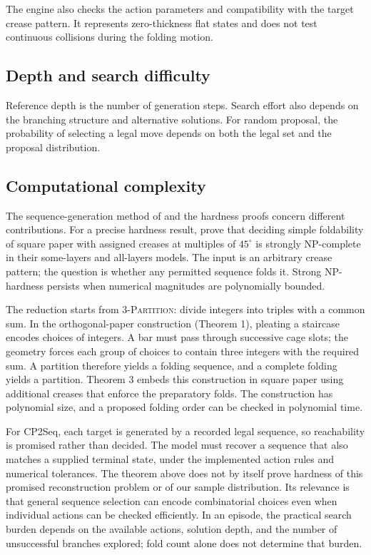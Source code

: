 The engine also checks the action parameters and compatibility with the target crease pattern. It represents
zero-thickness flat states and does not test continuous collisions during the folding motion.

\subsection{Depth and search difficulty}

Reference depth is the number of generation steps. Search effort also depends on the
branching structure and alternative solutions. For random proposal, the probability of
selecting a legal move depends on both the legal set and the proposal distribution.

\subsection{Computational complexity}
\label{app:folding-complexity}

The sequence-generation method of \citet{akitaya-cp2seq} and the hardness proofs concern
different contributions. For a precise hardness result, \citet[Theorem 3]{akitaya-hard}
prove that deciding simple foldability of square paper with assigned creases at multiples
of $45^\circ$ is strongly NP-complete in their some-layers and all-layers models.
The input is an arbitrary crease pattern; the question is whether any permitted sequence
folds it. Strong NP-hardness persists when numerical magnitudes are polynomially bounded.

The reduction starts from \textsc{3-Partition}: divide integers into triples with a common
sum. In the orthogonal-paper construction (Theorem 1), pleating a staircase encodes choices
of integers. A bar must pass through successive cage slots; the geometry forces each group
of choices to contain three integers with the required sum. A partition therefore yields
a folding sequence, and a complete folding yields a partition. Theorem 3 embeds this
construction in square paper using additional creases that enforce the preparatory folds.
The construction has polynomial size, and a proposed folding order can be checked in
polynomial time.

For CP2Seq, each target is generated by a recorded legal sequence, so reachability is
promised rather than decided. The model must recover a sequence that also matches a
supplied terminal state, under the implemented action rules and numerical tolerances.
The theorem above does not by itself prove hardness of this promised reconstruction
problem or of our sample distribution. Its relevance is that general sequence selection
can encode combinatorial choices even when individual actions can be checked efficiently.
In an episode, the practical search burden depends on the available actions, solution
depth, and the number of unsuccessful branches explored; fold count alone does not
determine that burden.

